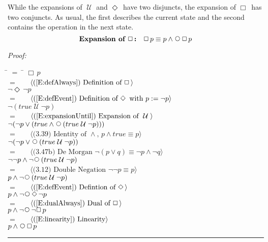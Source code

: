 \documentclass[fleqn, leqno]{article}
\newcommand{\lgap}{2pt}                             %
\newcommand{\mymathindent}{24pt}                    %
\newcommand{\Until}{\;\mathcal{U}\;}
\newcommand{\Next}{\;\,\text{\raisebox{3.5pt}{\circle{6}}}}
\newcommand{\Event}{\Diamond\,}
\newcommand{\Always}{\Box\,}
\newcommand{\myqed}{\hfill\rule[-.23ex]{1.2ex}{2.0ex}}
\newcommand{\Gll} {\langle}                         %
\newcommand{\Ggg} {\rangle}                         %
\newcommand{\Hint}[1]     {\ \ \ $\Gll              \mbox{#1} \Ggg$ }   %
\begin{document}

While the expansions of $\Until$ and $\Event$ have two disjuncts,
the expansion of $\Always$ has two conjuncts.
As usual, the first describes the current state and the second contains the operation in the next state.
\begin{equation}\label{E:expansionAlways}
\textbf{Expansion of $\Always$:}\quad \Always p \equiv p \land \Next\Always p
\end{equation}

\emph{Proof:}
\begin{tabbing}
\hspace{\mymathindent} \= $= \;$ \= \kill
  \> \>   $\Always p$\\[\lgap]
  \> $=$  \>  \Hint{(\ref{E:defAlways}) Definition of $\Always$}\\[\lgap]
  \> \>   $\neg\Event\neg p$\\[\lgap]
  \> $=$  \>  \Hint{(\ref{E:defEvent}) Definition of $\Event$ with $p := \neg p$}\\[\lgap]
  \> \>   $\neg(true \Until \neg p)$\\[\lgap]
  \> $=$  \>  \Hint{(\ref{E:expansionUntil}) Expansion of $\Until$}\\[\lgap]
  \> \>   $\neg(\neg p \lor (true \land \Next(true \Until \neg p)))$\\[\lgap]
  \> $=$  \>  \Hint{(3.39) Identity of $\land$, $p\land true\equiv p$}\\[\lgap]
  \> \>   $\neg(\neg p \lor \Next(true \Until \neg p))$\\[\lgap]
  \> $=$  \>  \Hint{(3.47b) De Morgan $\neg (p \lor q) \equiv \neg p \land \neg q$}\\[\lgap]
  \> \>   $\neg\neg p \land \neg\Next(true \Until \neg p)$\\[\lgap]
  \> $=$  \>  \Hint{(3.12) Double Negation $\neg\neg p\equiv p$}\\[\lgap]
  \> \>   $p \land \neg\Next(true \Until \neg p)$\\[\lgap]
  \> $=$  \>  \Hint{(\ref{E:defEvent}) Defintion of $\Event$}\\[\lgap]
  \> \>   $p \land \neg\Next\Event\neg p$\\[\lgap]
  \> $=$  \>  \Hint{(\ref{E:dualAlways}) Dual of $\Always$}\\[\lgap]
  \> \>   $p \land \neg\Next\neg\Always p$\\[\lgap]
  \> $=$  \>  \Hint{(\ref{E:linearity}) Linearity}\\[\lgap]
  \> \>   $p \land \Next\Always p$
\end{tabbing}
\myqed\\[\lgap]
\end{document}
